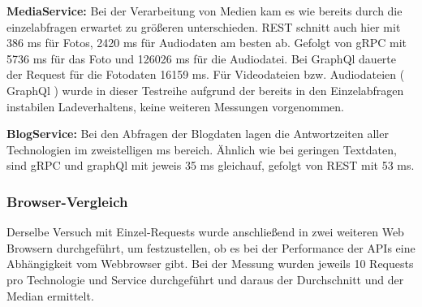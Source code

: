 \textbf{MediaService:}  
Bei der Verarbeitung von Medien kam es wie bereits durch die einzelabfragen erwartet zu größeren unterschieden. REST schnitt auch hier mit 386 ms für Fotos, 2420 ms für Audiodaten am besten ab. Gefolgt von gRPC mit 5736 ms für das Foto und 126026 ms für die Audiodatei. Bei GraphQl dauerte der Request für die Fotodaten 16159 ms.
Für Videodateien bzw. Audiodateien ( GraphQl ) wurde in dieser Testreihe aufgrund der bereits in den Einzelabfragen instabilen Ladeverhaltens, keine weiteren Messungen vorgenommen.


\textbf{BlogService:}  
Bei den Abfragen der Blogdaten lagen die Antwortzeiten aller Technologien im zweistelligen ms bereich. Ähnlich wie bei geringen Textdaten, sind gRPC und graphQl mit jeweis 35 ms gleichauf, gefolgt von REST mit 53 ms.

\clearpage
\subsubsection{Browser-Vergleich}
Derselbe Versuch mit Einzel-Requests wurde anschließend in zwei weiteren Web Browsern durchgeführt, um festzustellen, ob es bei der Performance der APIs eine Abhängigkeit vom Webbrowser gibt. 
Bei der Messung wurden jeweils 10 Requests pro Technologie und Service durchgeführt und daraus der Durchschnitt und der Median ermittelt.

